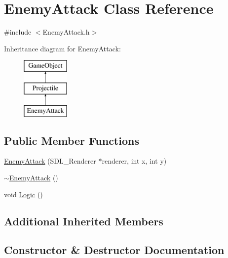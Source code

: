 \hypertarget{class_enemy_attack}{}\section{Enemy\+Attack Class Reference}
\label{class_enemy_attack}


{\ttfamily \#include $<$Enemy\+Attack.\+h$>$}

Inheritance diagram for Enemy\+Attack\+:\begin{figure}[H]
\begin{center}
\leavevmode
\includegraphics[height=3.000000cm]{class_enemy_attack}
\end{center}
\end{figure}
\subsection*{Public Member Functions}
\begin{DoxyCompactItemize}
\item 
\mbox{\hyperlink{class_enemy_attack_a169f1749ce1126148be5ec7d94554e45}{Enemy\+Attack}} (S\+D\+L\+\_\+\+Renderer $\ast$renderer, int x, int y)
\item 
\mbox{\hyperlink{class_enemy_attack_abc5fbac33c1c8d61ab70e4a480980c77}{$\sim$\+Enemy\+Attack}} ()
\item 
void \mbox{\hyperlink{class_enemy_attack_a2f735b2cbf13787217a5daed7ff8f7a4}{Logic}} ()
\end{DoxyCompactItemize}
\subsection*{Additional Inherited Members}


\subsection{Constructor \& Destructor Documentation}
\mbox{\label{class_enemy_attack_a169f1749ce1126148be5ec7d94554e45}} 
